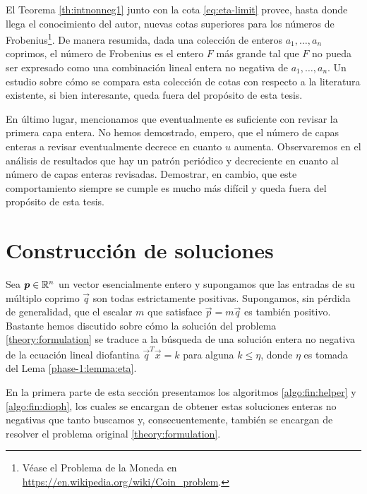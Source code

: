 El Teorema \ref{th:intnonneg1} junto con la cota \eqref{eq:eta-limit} provee, hasta donde llega el
conocimiento del autor, nuevas cotas superiores para los números de Frobenius\footnote{
	Véase el Problema de la Moneda en \url{https://en.wikipedia.org/wiki/Coin_problem}.
}. De manera resumida,
dada una colección de enteros $a_1, \ldots, a_n$ coprimos, el número de Frobenius es el entero $F$
más grande tal que $F$ no pueda ser expresado como una combinación lineal entera no negativa de
$a_1, \ldots, a_n$. Un estudio sobre cómo se compara esta colección de cotas con respecto a la
literatura existente, si bien interesante, queda fuera del propósito de esta tesis.

En último lugar, mencionamos que eventualmente es suficiente con revisar la primera capa entera. No
hemos demostrado, empero, que el número de capas enteras a revisar eventualmente decrece en cuanto
$u$ aumenta. Observaremos en el análisis de resultados que hay un patrón periódico y decreciente en
cuanto al número de capas enteras revisadas. Demostrar, en cambio, que este comportamiento siempre
se cumple es mucho más difícil y queda fuera del propósito de esta tesis.

\section{Construcción de soluciones}
\label{subsec:complex}

\noindent
Sea $\boldsymbol{p} \in \mathbb{R}^n$ un vector esencialmente entero y supongamos que las entradas de su múltiplo
coprimo $\vec{q}$ son todas estrictamente positivas. Supongamos, sin pérdida de generalidad, que el
escalar $m$ que satisface $\vec{p} = m\vec{q}$ es también positivo. Bastante hemos discutido sobre
cómo la solución del problema \eqref{theory:formulation} se traduce a la búsqueda de una solución
entera no negativa de la ecuación lineal diofantina $\vec{q}^T\vec{x} = k$ para alguna $k \leq \eta$,
donde $\eta$ es tomada del Lema \ref{phase-1:lemma:eta}.

En la primera parte de esta sección presentamos los algoritmos \ref{algo:fin:helper} y
\ref{algo:fin:dioph}, los cuales se encargan de obtener estas soluciones enteras no negativas que
tanto buscamos y, consecuentemente, también se encargan de resolver el problema original
\eqref{theory:formulation}.


